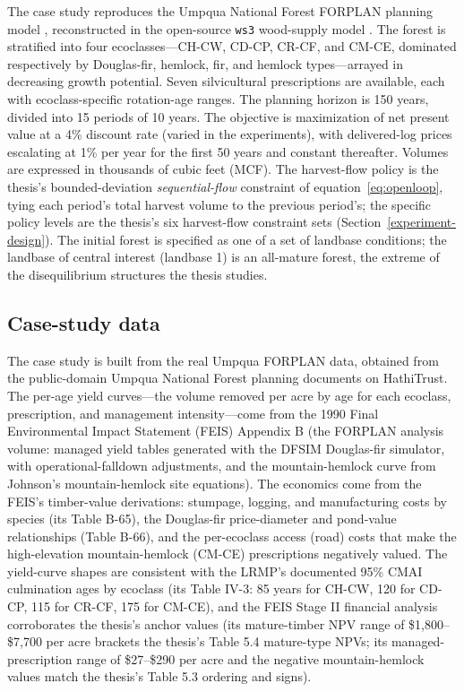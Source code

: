 \documentclass[12pt]{article}
\begin{document}
The case study reproduces the Umpqua National Forest FORPLAN planning model \citep{usda1987umpqua}, reconstructed in the open-source \texttt{ws3} wood-supply model \citep{paradis2026ws3}. The forest is stratified into four ecoclasses---CH-CW, CD-CP, CR-CF, and CM-CE, dominated respectively by Douglas-fir, hemlock, fir, and hemlock types---arrayed in decreasing growth potential. Seven silvicultural prescriptions are available, each with ecoclass-specific rotation-age ranges. The planning horizon is 150 years, divided into 15 periods of 10 years. The objective is maximization of net present value at a 4\% discount rate (varied in the experiments), with delivered-log prices escalating at 1\% per year for the first 50 years and constant thereafter. Volumes are expressed in thousands of cubic feet (MCF). The harvest-flow policy is the thesis's bounded-deviation \emph{sequential-flow} constraint of equation~\eqref{eq:openloop}, tying each period's total harvest volume to the previous period's; the specific policy levels are the thesis's six harvest-flow constraint sets (Section~\ref{experiment-design}). The initial forest is specified as one of a set of landbase conditions; the landbase of central interest (landbase 1) is an all-mature forest, the extreme of the disequilibrium structures the thesis studies.

\hypertarget{case-study-data}{%
\subsection{Case-study data}\label{case-study-data}}

The case study is built from the real Umpqua FORPLAN data, obtained from the public-domain Umpqua National Forest planning documents on HathiTrust. The per-age yield curves---the volume removed per acre by age for each ecoclass, prescription, and management intensity---come from the 1990 Final Environmental Impact Statement (FEIS) Appendix B \citep{usda1990umpqua} (the FORPLAN analysis volume: managed yield tables generated with the DFSIM Douglas-fir simulator, with operational-falldown adjustments, and the mountain-hemlock curve from Johnson's mountain-hemlock site equations). The economics come from the FEIS's timber-value derivations: stumpage, logging, and manufacturing costs by species (its Table B-65), the Douglas-fir price-diameter and pond-value relationships (Table B-66), and the per-ecoclass access (road) costs that make the high-elevation mountain-hemlock (CM-CE) prescriptions negatively valued. The yield-curve shapes are consistent with the LRMP's documented 95\% CMAI culmination ages by ecoclass (its Table IV-3: 85 years for CH-CW, 120 for CD-CP, 115 for CR-CF, 175 for CM-CE), and the FEIS Stage II financial analysis corroborates the thesis's anchor values (its mature-timber NPV range of \$1,800--\$7,700 per acre brackets the thesis's Table 5.4 mature-type NPVs; its managed-prescription range of \$27--\$290 per acre and the negative mountain-hemlock values match the thesis's Table 5.3 ordering and signs).
\end{document}
